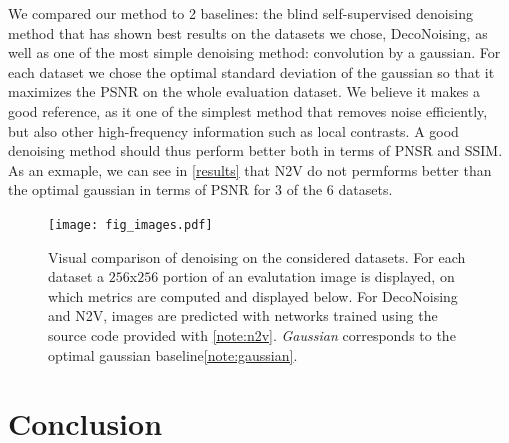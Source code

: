 \documentclass{article}
\begin{document}
We compared our method to 2 baselines: the blind self-supervised denoising method that has shown best results on the datasets we chose, DecoNoising, as well as one of the most simple denoising method: convolution by a gaussian.
For each dataset we chose the optimal standard deviation of the gaussian so that it maximizes the PSNR on the whole evaluation dataset.
We believe it makes a good reference, as it one of the simplest method that removes noise efficiently, but also other high-frequency information such as local contrasts.
A good denoising method should thus perform better both in terms of PNSR and SSIM.
As an exmaple, we can see in \ref{results} that N2V do not permforms better than the optimal gaussian in terms of PSNR for 3 of the 6 datasets.

\begin{figure}[ht]
\vskip 0.2in
\begin{center}
\texttt{[image: fig\_images.pdf]}
\caption{Visual comparison of denoising on the considered datasets. For each dataset a $256$x$256$ portion of an evalutation image is displayed, on which metrics are computed and displayed below. For DecoNoising and N2V, images are predicted with networks trained using the source code provided with \cite{goncharova2020}\cref{note:n2v}. \textit{Gaussian} corresponds to the optimal gaussian baseline\cref{note:gaussian}.}
\label{fig:images}
\end{center}
\vskip -0.2in
\end{figure}

\section{Conclusion}



{\small


}
\end{document}
